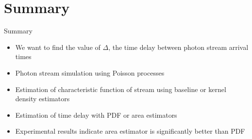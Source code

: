 \documentclass{beamer}
\begin{document}
\section*{Summary}

\begin{frame}{Summary}

  \begin{itemize}[<+->]
  \item We want to find the value of $\Delta$, the time delay between photon
    stream arrival times
  \item Photon stream simulation using Poisson processes
  \item Estimation of characteristic function of stream using baseline or kernel density estimators
  \item Estimation of time delay with PDF or area estimators
  \item Experimental results indicate area estimator is significantly
    better than PDF
  \end{itemize}
\end{frame}
\end{document}
